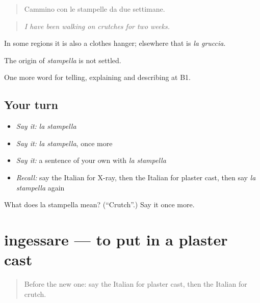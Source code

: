 \begin{quote}
Cammino con le stampelle da due settimane.
\end{quote}

\begin{quote}
\emph{I have been walking on crutches for two weeks.}
\end{quote}

In some regions it is also a clothes hanger; elsewhere that is \emph{la gruccia}.

\begin{cousinweb}
The origin of \emph{stampella} is not settled.
\end{cousinweb}

\begin{grammarlens}[title={What you've built}]
One more word for telling, explaining and describing at B1.
\end{grammarlens}

\subsection*{Your turn}
\begin{itemize}
\raggedright
  \item \emph{Say it:} \emph{la stampella}
  \item \emph{Say it:} \emph{la stampella}, once more
  \item \emph{Say it:} a sentence of your own with \emph{la stampella}
  \item \emph{Recall:} say the Italian for X-ray, then the Italian for plaster cast, then say \emph{la stampella} again
\end{itemize}

\begin{tcolorbox}[breakable,colback=teal!4,colframe=teal!35!black,title={Before you move on}]
What does la stampella mean? (\textquotedblleft{}Crutch\textquotedblright{}.) Say it once more.
\end{tcolorbox}
\section[ingessare]{ingessare — to put in a plaster cast}

\label{lesson:IT-C484-ingessare}



\begin{quote}
Before the new one: say the Italian for plaster cast, then the Italian for crutch.
\end{quote}

